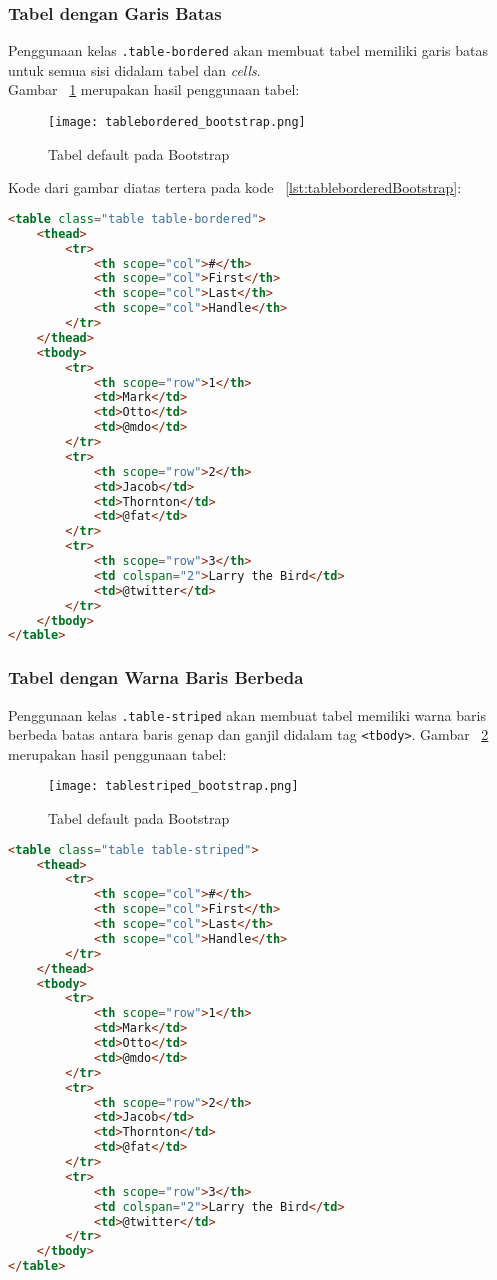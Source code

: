 \subsubsection{Tabel dengan Garis Batas}
Penggunaan kelas \texttt{.table-bordered} akan membuat tabel memiliki garis batas untuk semua sisi didalam tabel dan \textit{cells}.\\
Gambar ~\ref{fig:tableBorderedBootstrap} merupakan hasil penggunaan tabel:
\begin{figure} [H]
	\centering  
	\texttt{[image: tablebordered\_bootstrap.png]}  
	\caption{Tabel default pada Bootstrap} 
	\label{fig:tableBorderedBootstrap}
\end{figure}

\noindent Kode dari gambar diatas tertera pada kode ~\ref{lst:tableborderedBootstrap}:
\begin{lstlisting}[style=customhtml, language=HTML,  basicstyle=\ttfamily, frame=single, columns=fullflexible, keepspaces=true, breaklines=true, showstringspaces=false, label={lst:tableborderedBootstrap}, caption=Kode tabel dengan garis batas pada bootstrap 4] 
<table class="table table-bordered">
	<thead>
		<tr>
			<th scope="col">#</th>
			<th scope="col">First</th>
			<th scope="col">Last</th>
			<th scope="col">Handle</th>
		</tr>
	</thead>
	<tbody>
		<tr>
			<th scope="row">1</th>
			<td>Mark</td>
			<td>Otto</td>
			<td>@mdo</td>
		</tr>
		<tr>
			<th scope="row">2</th>
			<td>Jacob</td>
			<td>Thornton</td>
			<td>@fat</td>
		</tr>
		<tr>
			<th scope="row">3</th>
			<td colspan="2">Larry the Bird</td>
			<td>@twitter</td>
		</tr>
	</tbody>
</table>
\end{lstlisting}

\subsubsection{Tabel dengan Warna Baris Berbeda}
Penggunaan kelas \texttt{.table-striped} akan membuat tabel memiliki warna baris berbeda batas antara baris genap dan ganjil didalam tag \texttt{<tbody>}.
Gambar ~\ref{fig:tableStripedBootstrap} merupakan hasil penggunaan tabel:
\begin{figure} [H]
	\centering  
	\texttt{[image: tablestriped\_bootstrap.png]}  
	\caption{Tabel default pada Bootstrap} 
	\label{fig:tableStripedBootstrap}
\end{figure}

\begin{lstlisting}[style=customhtml, language=HTML,  basicstyle=\ttfamily, frame=single, columns=fullflexible, keepspaces=true, breaklines=true, showstringspaces=false, label={lst:tablestripedBootstrap}, caption=Kode tabel dengan warna baris berbeda pada bootstrap 4.] 
<table class="table table-striped">
	<thead>
		<tr>
			<th scope="col">#</th>
			<th scope="col">First</th>
			<th scope="col">Last</th>
			<th scope="col">Handle</th>
		</tr>
	</thead>
	<tbody>
		<tr>
			<th scope="row">1</th>
			<td>Mark</td>
			<td>Otto</td>
			<td>@mdo</td>
		</tr>
		<tr>
			<th scope="row">2</th>
			<td>Jacob</td>
			<td>Thornton</td>
			<td>@fat</td>
		</tr>
		<tr>
			<th scope="row">3</th>
			<td colspan="2">Larry the Bird</td>
			<td>@twitter</td>
		</tr>
	</tbody>
</table>
\end{lstlisting}


